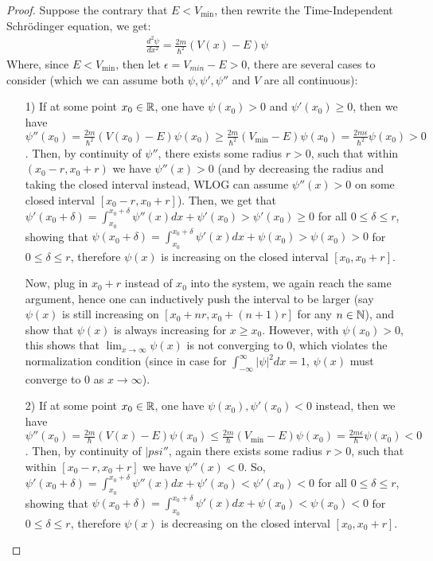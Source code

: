 \documentclass{article}
\begin{document}
\begin{proof}
    Suppose the contrary that $E< V_{\min}$, then rewrite the Time-Independent Schrödinger equation, we get:
    \begin{align}
        \frac{d^2\psi}{dx^2} = \frac{2m}{\hbar^2}(V(x) - E)\psi
    \end{align}
    Where, since $E<V_{\min}$, then let $\epsilon=V_{min}-E>0$, there are several cases to consider (which we can assume both $\psi,\psi',\psi''$ and $V$ are all continuous):
    \begin{itemize}
        \item[1)] If at some point $x_0\in\mathbb{R}$, one have $\psi(x_0)>0$ and $\psi'(x_0)\geq 0$, then we have $\psi''(x_0) =\frac{2m}{\hbar^2}(V(x_0)-E)\psi(x_0)\geq \frac{2m}{\hbar^2}(V_{\min}-E)\psi(x_0)=\frac{2m\epsilon}{\hbar^2}\psi(x_0)>0$. Then, by continuity of $\psi''$, there exists some radius $r>0$, such that within $(x_0-r,x_0+r)$ we have $\psi''(x)>0$ (and by decreasing the radius and taking the closed interval instead, WLOG can assume $\psi''(x)>0$ on some closed interval $[x_0-r,x_0+r]$). Then, we get that $\psi'(x_0+\delta) = \int_{x_0}^{x_0+\delta}\psi''(x)dx + \psi'(x_0) > \psi'(x_0)\geq 0$ for all $0\leq \delta\leq r$, showing that $\psi(x_0+\delta)=\int_{x_0}^{x_0+\delta}\psi'(x)dx+\psi(x_0)>\psi(x_0)>0$ for $0\leq \delta\leq r$, therefore $\psi(x)$ is increasing on the closed interval $[x_0,x_0+r]$.
        
        Now, plug in $x_0+r$ instead of $x_0$ into the system, we again reach the same argument, hence one can inductively push the interval to be larger (say $\psi(x)$ is still increasing on $[x_0+nr, x_0+(n+1)r]$ for any $n \in\mathbb{N}$), and show that $\psi(x)$ is always increasing for $x\geq x_0$. However, with $\psi(x_0)>0$, this shows that $\lim_{x\rightarrow\infty}\psi(x)$ is not converging to $0$, which violates the normalization condition (since in case for $\int_{-\infty}^{\infty}|\psi|^2dx=1$, $\psi(x)$ must converge to $0$ as $x\rightarrow\infty$).

        \item[2)] If at some point $x_0\in\mathbb{R}$, one have $\psi(x_0),\psi'(x_0)<0$ instead, then we have $\psi''(x_0)=\frac{2m}{\hbar}(V(x)-E)\psi(x_0)\leq \frac{2m}{\hbar}(V_{\min}-E)\psi(x_0)=\frac{2m\epsilon}{\hbar}\psi(x_0)<0$. Then, by continuity of $|psi''$, again there exists some radius $r>0$, such that within $[x_0-r,x_0+r]$ we have $\psi''(x)<0$. So, $\psi'(x_0+\delta)=\int_{x_0}^{x_0+\delta}\psi''(x)dx+\psi'(x_0)<\psi'(x_0)<0$ for all $0\leq \delta\leq r$, showing that $\psi(x_0+\delta)=\int_{x_0}^{x_0+\delta}\psi'(x)dx+\psi(x_0)<\psi(x_0)<0$ for $0\leq \delta\leq r$, therefore $\psi(x)$ is decreasing on the closed interval $[x_0,x_0+r]$.
        

\end{itemize}
\end{proof}
\end{document}
